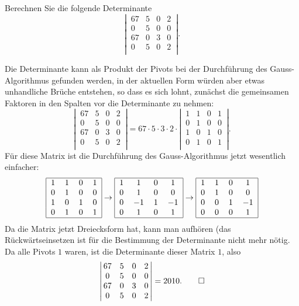 Berechnen Sie die folgende Determinante
\[
\left|\,\begin{matrix}
67&5&0&2\\
0&5&0&0\\
67&0&3&0\\
0&5&0&2\\
\end{matrix}\,\right|.
\]

\begin{loesung}
Die Determinante kann als Produkt der Pivots bei der Durchführung des
Gauss-Algorithmus gefunden werden, in der aktuellen Form würden aber
etwas unhandliche Brüche entstehen, so dass es sich lohnt, zunächst
die gemeinsamen Faktoren in den Spalten vor die Determinante zu nehmen:
\[
\left|\,\begin{matrix}
67&5&0&2\\
0&5&0&0\\
67&0&3&0\\
0&5&0&2\\
\end{matrix}\,\right|
=
67\cdot5\cdot3\cdot 2\cdot
\left|\,\begin{matrix}
1&1&0&1\\
0&1&0&0\\
1&0&1&0\\
0&1&0&1\\
\end{matrix}\,\right|.
\]
Für diese Matrix ist die Durchführung des Gauss-Algorithmus jetzt
wesentlich einfacher:
\[
\begin{tabular}{|cccc|}
\hline
1&1&0&1\\
0&1&0&0\\
1&0&1&0\\
0&1&0&1\\
\hline
\end{tabular}
\rightarrow
\begin{tabular}{|cccc|}
\hline
1&1&0&1\\
0&1&0&0\\
0&$-1$&1&$-1$\\
0&1&0&1\\
\hline
\end{tabular}
\rightarrow
\begin{tabular}{|cccc|}
\hline
1&1&0&1\\
0&1&0&0\\
0&0&1&$-1$\\
0&0&0&1\\
\hline
\end{tabular}
\]
Da die Matrix jetzt Dreiecksform hat, kann man aufhören
(das Rückwärtseinsetzen ist für die Bestimmung der
Determinante nicht mehr nötig. Da alle Pivots $1$ waren, ist
die Determinante dieser Matrix $1$, also
\[
\left|\,\begin{matrix}
67&5&0&2\\
0&5&0&0\\
67&0&3&0\\
0&5&0&2\\
\end{matrix}\,\right|=2010.
\qedhere
\]
\end{loesung}

